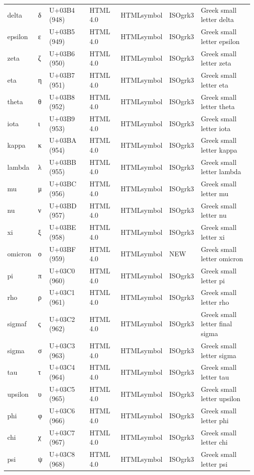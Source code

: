 \documentclass{article}
\begin{document}
\begin{tabular}{lllllll}
delta & δ & U+03B4 (948) & HTML 4.0 & HTMLsymbol & ISOgrk3 & Greek small letter delta \\
epsilon & ε & U+03B5 (949) & HTML 4.0 & HTMLsymbol & ISOgrk3 & Greek small letter epsilon \\
zeta & ζ & U+03B6 (950) & HTML 4.0 & HTMLsymbol & ISOgrk3 & Greek small letter zeta \\
eta & η & U+03B7 (951) & HTML 4.0 & HTMLsymbol & ISOgrk3 & Greek small letter eta \\
theta & θ & U+03B8 (952) & HTML 4.0 & HTMLsymbol & ISOgrk3 & Greek small letter theta \\
iota & ι & U+03B9 (953) & HTML 4.0 & HTMLsymbol & ISOgrk3 & Greek small letter iota \\
kappa & κ & U+03BA (954) & HTML 4.0 & HTMLsymbol & ISOgrk3 & Greek small letter kappa \\
lambda & λ & U+03BB (955) & HTML 4.0 & HTMLsymbol & ISOgrk3 & Greek small letter lambda \\
mu & μ & U+03BC (956) & HTML 4.0 & HTMLsymbol & ISOgrk3 & Greek small letter mu \\
nu & ν & U+03BD (957) & HTML 4.0 & HTMLsymbol & ISOgrk3 & Greek small letter nu \\
xi & ξ & U+03BE (958) & HTML 4.0 & HTMLsymbol & ISOgrk3 & Greek small letter xi \\
omicron & ο & U+03BF (959) & HTML 4.0 & HTMLsymbol & NEW & Greek small letter omicron \\
pi & π & U+03C0 (960) & HTML 4.0 & HTMLsymbol & ISOgrk3 & Greek small letter pi \\
rho & ρ & U+03C1 (961) & HTML 4.0 & HTMLsymbol & ISOgrk3 & Greek small letter rho \\
sigmaf & ς & U+03C2 (962) & HTML 4.0 & HTMLsymbol & ISOgrk3 & Greek small letter final sigma \\
sigma & σ & U+03C3 (963) & HTML 4.0 & HTMLsymbol & ISOgrk3 & Greek small letter sigma \\
tau & τ & U+03C4 (964) & HTML 4.0 & HTMLsymbol & ISOgrk3 & Greek small letter tau \\
upsilon & υ & U+03C5 (965) & HTML 4.0 & HTMLsymbol & ISOgrk3 & Greek small letter upsilon \\
phi & φ & U+03C6 (966) & HTML 4.0 & HTMLsymbol & ISOgrk3 & Greek small letter phi \\
chi & χ & U+03C7 (967) & HTML 4.0 & HTMLsymbol & ISOgrk3 & Greek small letter chi \\
psi & ψ & U+03C8 (968) & HTML 4.0 & HTMLsymbol & ISOgrk3 & Greek small letter psi \\

\end{tabular}
\end{document}
